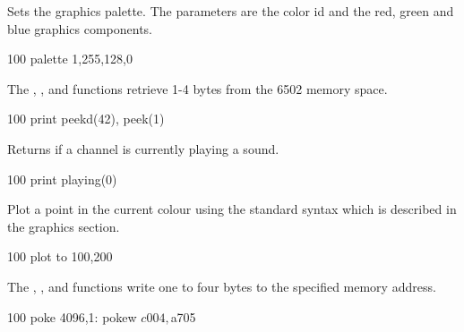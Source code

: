 \begin{entry}
Sets the graphics palette. The parameters are the color id and the red, green and blue graphics components.

\begin{lstexample}
100 palette 1,255,128,0
\end{lstexample}
\end{entry}

\begin{entry}
The , ,  and  functions retrieve 1-4 bytes from the 6502 memory space.

\begin{lstexample}
100 print peekd(42), peek(1)
\end{lstexample}
\end{entry}

\begin{entry}
Returns  if a channel is currently playing a sound.

\begin{lstexample}
100 print playing(0)
\end{lstexample}
\end{entry}

\begin{entry}
Plot a point in the current colour using the standard syntax which is described in the graphics section.

\begin{lstexample}
100 plot to 100,200
\end{lstexample}
\end{entry}

\begin{entry}
The , ,  and  functions write one to four bytes to the specified memory address.

\begin{lstexample}
100 poke 4096,1: pokew $c004,$a705
\end{lstexample}
\end{entry}

